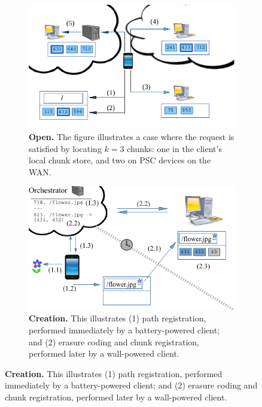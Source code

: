 \begin{figure}[t]

  \begin{subfigure}[t]{\columnwidth}

    \includegraphics[width=\columnwidth]{./figures/open.pdf}

    \caption{\small \textbf{Open.} The figure illustrates a case where the
      request is satisfied by locating $k = 3$ chunks: one in the client's
    local chunk store, and two on PSC devices on the WAN.}

    \label{fig-design-open}
  \end{subfigure}\hfill
  \begin{subfigure}[t]{\columnwidth}

    \includegraphics[width=\columnwidth]{./figures/create.pdf}

    \caption{\small \textbf{Creation.} This illustrates (1) path registration,
      performed immediately by a battery-powered client; and (2) erasure coding
    and chunk registration, performed later by a wall-powered client.}

    \label{fig-design-creation}
  \end{subfigure}
  \vspace*{0.05in}


  \vspace*{-0.2in}
\end{figure}


